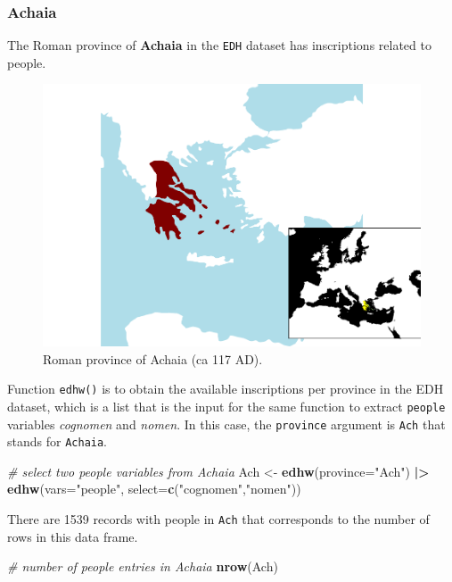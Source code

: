 \documentclass[a4paper,11pt]{memoir}
\newenvironment{Shaded}{\begin{snugshade}}{\end{snugshade}}
\newcommand{\CommentTok}[1]{\textcolor[rgb]{0.56,0.35,0.01}{\textit{#1}}}
\newcommand{\DataTypeTok}[1]{\textcolor[rgb]{0.13,0.29,0.53}{#1}}
\newcommand{\ErrorTok}[1]{\textcolor[rgb]{0.64,0.00,0.00}{\textbf{#1}}}
\newcommand{\KeywordTok}[1]{\textcolor[rgb]{0.13,0.29,0.53}{\textbf{#1}}}
\newcommand{\NormalTok}[1]{#1}
\newcommand{\OperatorTok}[1]{\textcolor[rgb]{0.81,0.36,0.00}{\textbf{#1}}}
\newcommand{\StringTok}[1]{\textcolor[rgb]{0.31,0.60,0.02}{#1}}
\begin{document}
\hypertarget{achaia}{%
\subsubsection{Achaia}\label{achaia}}

The Roman province of \textbf{Achaia} in the \texttt{EDH} dataset has
inscriptions related to people.


\begin{figure}

{\centering \includegraphics[width=0.25\linewidth]{img/unnamed-chunk-3-1} 

}

\caption{Roman province of Achaia (ca 117 AD).}\label{fig:unnamed-chunk-3}
\end{figure}

Function \texttt{edhw()} is to obtain the available inscriptions per
province in the EDH dataset, which is a list that is the input for the
same function to extract \texttt{people} variables \emph{cognomen} and
\emph{nomen}. In this case, the
\texttt{\textquotesingle{}province\textquotesingle{}} argument is
\texttt{Ach} that stands for \texttt{Achaia}.

\begin{Shaded}
\begin{Highlighting}[]
\CommentTok{# select two people variables from Achaia}
\NormalTok{Ach <-}\StringTok{ }\KeywordTok{edhw}\NormalTok{(}\DataTypeTok{province=}\StringTok{"Ach"}\NormalTok{) }\OperatorTok{|}\ErrorTok{>}\StringTok{ }
\StringTok{  }\KeywordTok{edhw}\NormalTok{(}\DataTypeTok{vars=}\StringTok{"people"}\NormalTok{, }\DataTypeTok{select=}\KeywordTok{c}\NormalTok{(}\StringTok{"cognomen"}\NormalTok{,}\StringTok{"nomen"}\NormalTok{))}
\end{Highlighting}
\end{Shaded}

There are 1539 records with people in \texttt{Ach} that corresponds to
the number of rows in this data frame.

\begin{Shaded}
\begin{Highlighting}[]
\CommentTok{# number of people entries in Achaia}
\KeywordTok{nrow}\NormalTok{(Ach)}
\end{Highlighting}
\end{Shaded}
\end{document}
